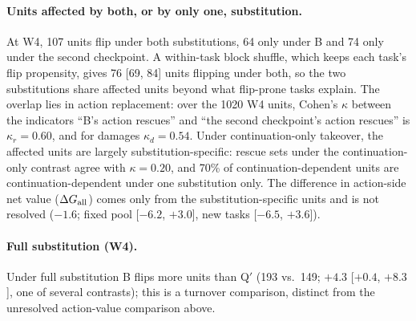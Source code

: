 \paragraph{Units affected by both, or by only one, substitution.} At W4, 107 units flip under both substitutions, 64 only under B and 74 only under the second checkpoint. A within-task block shuffle, which keeps each task's flip propensity, gives 76 [69, 84] units flipping under both, so the two substitutions share affected units beyond what flip-prone tasks explain. %
The overlap lies in action replacement: over the 1020 W4 units, Cohen's $\kappa$ between the indicators ``B's action rescues'' and ``the second checkpoint's action rescues'' is $\kappa_r=0.60$, and for damages $\kappa_d=0.54$. Under continuation-only takeover, the affected units are largely substitution-specific: rescue sets under the continuation-only contrast agree with $\kappa=0.20$, and 70\% of continuation-dependent units are continuation-dependent under one substitution only. %
 The difference in action-side net value ($\Delta G_{\mathrm{all}}$) comes only from the substitution-specific units and is not resolved ($-1.6$\pp{}; fixed pool [$-6.2$, $+3.0$], new tasks [$-6.5$, $+3.6$]). %

\paragraph{Full substitution (W4).} Under full substitution B flips more units than Q$'$ (193 vs.\ 149; $+4.3$ [$+0.4$, $+8.3$]\pp{}, one of several contrasts); this is a turnover comparison, distinct from the unresolved action-value comparison above. %


